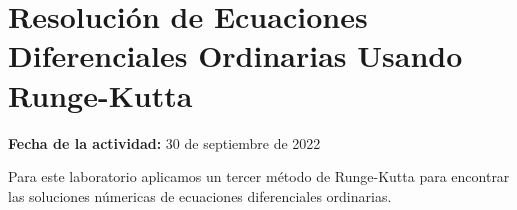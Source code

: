 \documentclass[../portafolio.tex]{subfiles}
\begin{document}


\section{Resoluci\'on de Ecuaciones Diferenciales Ordinarias Usando Runge-Kutta}   %

\hfill \textbf{Fecha de la actividad:} 30 de septiembre de 2022

\medskip

Para este laboratorio aplicamos un tercer m\'etodo de Runge-Kutta para encontrar las soluciones n\'umericas de ecuaciones diferenciales ordinarias. 
\end{document}

